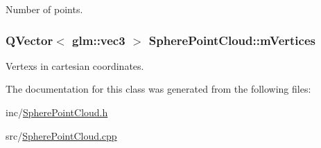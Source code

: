 Number of points. 

\hypertarget{class_sphere_point_cloud_a03bccf235a21adebdfcd6a8e4c407c72}{
\subsubsection[{m\+Vertices}]{\setlength{\rightskip}{0pt plus 5cm}Q\+Vector$<$ glm\+::vec3 $>$ Sphere\+Point\+Cloud\+::m\+Vertices\hspace{0.3cm}{\ttfamily [protected]}}}\label{class_sphere_point_cloud_a03bccf235a21adebdfcd6a8e4c407c72}


Vertexs in cartesian coordinates. 



The documentation for this class was generated from the following files\+:\begin{DoxyCompactItemize}
\item 
inc/\hyperlink{_sphere_point_cloud_8h}{Sphere\+Point\+Cloud.\+h}\item 
src/\hyperlink{_sphere_point_cloud_8cpp}{Sphere\+Point\+Cloud.\+cpp}\end{DoxyCompactItemize}
